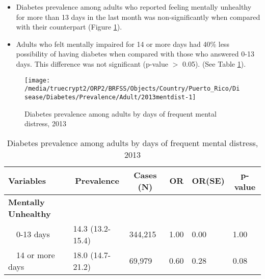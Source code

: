  \newpage
\begin{itemize}

\item Diabetes prevalence among adults who reported feeling mentally unhealthy for more than 13 days in the last month was non-significantly  when compared with their counterpart (Figure \ref{fig:mental.Diabetes.2013}).


\item  Adults who felt mentally impaired for 14 or more days had 40\% less possibility of having diabetes when compared with those who answered 0-13 days. This difference was not significant (p-value $>$ 0.05). (See Table \ref{tab:mental.Diabetes.2013}).

\end{itemize}

\begin{figure}[H]
\centering
\caption{Diabetes prevalence among adults by days of frequent mental distress, 2013}
\label{fig:mental.Diabetes.2013}

\begin{knitrout}
\color{fgcolor}

{\centering \texttt{[image: /media/truecrypt2/ORP2/BRFSS/Objects/Country/Puerto\_Rico/Disease/Diabetes/Prevalence/Adult/2013mentdist-1]} 

}



\end{knitrout}
 \end{figure}

\begin{table}[H]
\caption{Diabetes prevalence among adults by days of frequent mental distress, 2013\label{tab:mental.Diabetes.2013}} 
\begin{center}
\begin{tabular}{llllll}
\hline\hline
\multicolumn{1}{l}{Variables}&\multicolumn{1}{c}{Prevalence}&\multicolumn{1}{c}{Cases (N)}&\multicolumn{1}{c}{OR}&\multicolumn{1}{c}{OR(SE)}&\multicolumn{1}{c}{p-value}\tabularnewline
\hline
{\bfseries Mentally Unhealthy}&&&&&\tabularnewline
~~0-13 days&14.3 (13.2-15.4)&344,215&1.00&0.00&1.00\tabularnewline
~~14 or more days&18.0 (14.7-21.2)& 69,979&0.60&0.28&0.08\tabularnewline
\hline
\end{tabular}\end{center}

\end{table}



